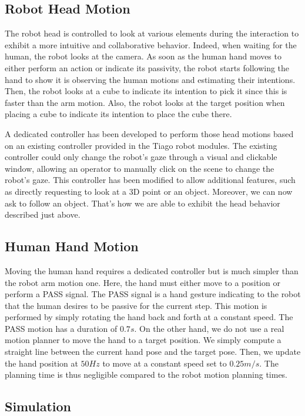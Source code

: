 \subsection{Robot Head Motion}

The robot head is controlled to look at various elements during the interaction to exhibit a more intuitive and collaborative behavior. 
Indeed, when waiting for the human, the robot looks at the camera. As soon as the human hand moves to either perform an action or indicate its passivity, the robot starts following the hand to show it is observing the human motions and estimating their intentions.
Then, the robot looks at a cube to indicate its intention to pick it since this is faster than the arm motion. 
Also, the robot looks at the target position when placing a cube to indicate its intention to place the cube there.

A dedicated controller has been developed to perform those head motions based on an existing controller provided in the Tiago robot modules. The existing controller could only change the robot's gaze through a visual and clickable window, allowing an operator to manually click on the scene to change the robot's gaze. This controller has been modified to allow additional features, such as directly requesting to look at a 3D point or an object. Moreover, we can now ask to follow an object. That's how we are able to exhibit the head behavior described just above.  

\subsection{Human Hand Motion}

Moving the human hand requires a dedicated controller but is much simpler than the robot arm motion one. Here, the hand must either move to a position or perform a PASS signal. The PASS signal is a hand gesture indicating to the robot that the human desires to be passive for the current step. This motion is performed by simply rotating the hand back and forth at a constant speed. The PASS motion has a duration of $0.7s$. 
On the other hand, we do not use a real motion planner to move the hand to a target position. We simply compute a straight line between the current hand pose and the target pose. Then, we update the hand position at $50Hz$ to move at a constant speed set to $0.25 m/s$. The planning time is thus negligible compared to the robot motion planning times.

\subsection{Simulation}

